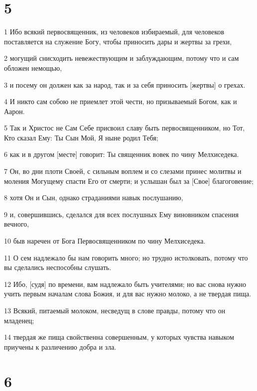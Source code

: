 \chapter{5}

\par 1 Ибо всякий первосвященник, из человеков избираемый, для человеков поставляется на служение Богу, чтобы приносить дары и жертвы за грехи,
\par 2 могущий снисходить невежествующим и заблуждающим, потому что и сам обложен немощью,
\par 3 и посему он должен как за народ, так и за себя приносить [жертвы] о грехах.
\par 4 И никто сам собою не приемлет этой чести, но призываемый Богом, как и Аарон.
\par 5 Так и Христос не Сам Себе присвоил славу быть первосвященником, но Тот, Кто сказал Ему: Ты Сын Мой, Я ныне родил Тебя;
\par 6 как и в другом [месте] говорит: Ты священник вовек по чину Мелхиседека.
\par 7 Он, во дни плоти Своей, с сильным воплем и со слезами принес молитвы и моления Могущему спасти Его от смерти; и услышан был за [Свое] благоговение;
\par 8 хотя Он и Сын, однако страданиями навык послушанию,
\par 9 и, совершившись, сделался для всех послушных Ему виновником спасения вечного,
\par 10 быв наречен от Бога Первосвященником по чину Мелхиседека.
\par 11 О сем надлежало бы нам говорить много; но трудно истолковать, потому что вы сделались неспособны слушать.
\par 12 Ибо, [судя] по времени, вам надлежало быть учителями; но вас снова нужно учить первым началам слова Божия, и для вас нужно молоко, а не твердая пища.
\par 13 Всякий, питаемый молоком, несведущ в слове правды, потому что он младенец;
\par 14 твердая же пища свойственна совершенным, у которых чувства навыком приучены к различению добра и зла.

\chapter{6}

